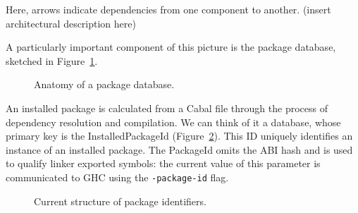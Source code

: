 \documentclass{article}
\begin{document}
Here, arrows indicate dependencies from one component to another.
(insert architectural description here)

A particularly important component of this picture is the package
database, sketched in Figure~\ref{fig:pkgdb}.

\begin{figure}[H]
\label{fig:pkgdb}\caption{Anatomy of a package database.}
\end{figure}

An installed package is calculated from a Cabal file through the process
of dependency resolution and compilation.  We can think of it a
database, whose primary key is the InstalledPackageId
(Figure~\ref{fig:current-pkgid}).  This ID uniquely identifies an
instance of an installed package.  The PackageId omits the ABI hash and
is used to qualify linker exported symbols: the current value of this
parameter is communicated to GHC using the \verb|-package-id| flag.

\begin{figure}
\label{fig:current-pkgid}\caption{Current structure of package identifiers.}
\end{figure}
\end{document}
